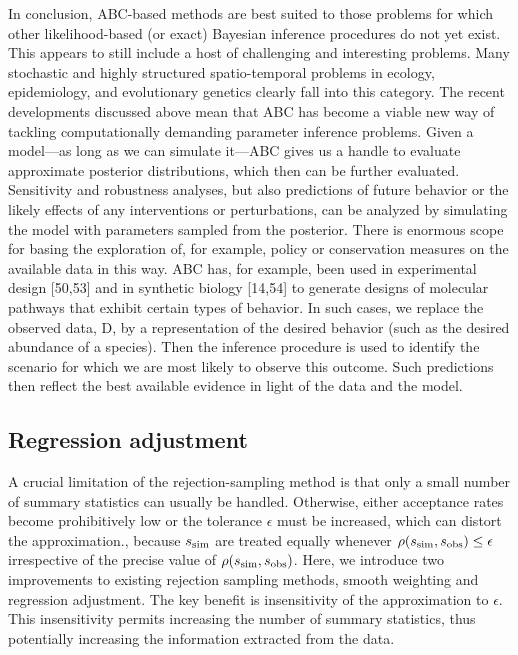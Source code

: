 In conclusion, ABC-based methods are best suited to those problems for which other likelihood-based (or exact) Bayesian inference procedures do not yet exist. This appears to still include a host of challenging and interesting problems. Many stochastic and highly structured spatio-temporal problems in ecology, epidemiology, and evolutionary genetics clearly fall into this category. The recent developments discussed above mean that ABC has become a viable new way of tackling computationally demanding parameter inference problems. Given a model—as long as we can simulate it—ABC gives us a handle to evaluate approximate posterior distributions, which then can be further evaluated. Sensitivity and robustness analyses, but also predictions of future behavior or the likely effects of any interventions or perturbations, can be analyzed by simulating the model with parameters sampled from the posterior. There is enormous scope for basing the exploration of, for example, policy or conservation measures on the available data in this way. ABC has, for example, been used in experimental design [50,53] and in synthetic biology [14,54] to generate designs of molecular pathways that exhibit certain types of behavior. In such cases, we replace the observed data, D, by a representation of the desired behavior (such as the desired abundance of a species). Then the inference procedure is used to identify the scenario for which we are most likely to observe this outcome. Such predictions then reflect the best available evidence in light of the data and the model.


\subsection{Regression adjustment}

A crucial limitation of the rejection-sampling method is that only a small number of summary statistics can usually be handled. Otherwise, either acceptance rates become prohibitively low or the tolerance $\epsilon$ must be increased, which can distort the approximation., because $s_\mathrm{sim}$ are treated equally whenever $\rho \qty(s_\mathrm{sim}, s_\mathrm{obs}) \leq \epsilon$ irrespective of the precise value of $\rho \qty(s_\mathrm{sim}, s_\mathrm{obs})$. Here, we introduce two improvements to existing rejection sampling methods, smooth weighting and regression adjustment. The key benefit is insensitivity of the approximation to $\epsilon$. This insensitivity permits increasing the number of summary statistics, thus potentially increasing the information extracted from the data. 

